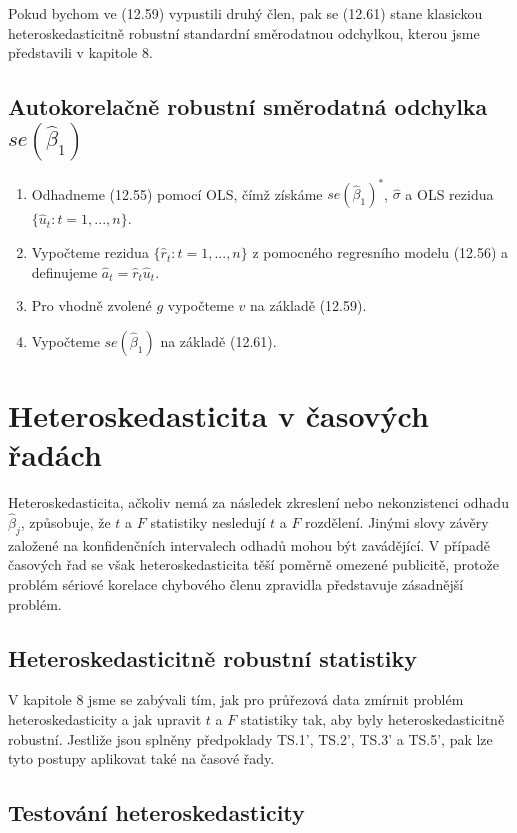 Pokud bychom ve (12.59) vypustili druhý člen, pak se (12.61) stane klasickou heteroskedasticitně robustní standardní směrodatnou odchylkou, kterou jsme představili v kapitole 8.

\subsection{Autokorelačně robustní směrodatná odchylka $se(\hat{\beta}_1)$}

\begin{enumerate}
\item Odhadneme (12.55) pomocí OLS, čímž získáme $se(\hat{\beta}_1)^*$, $\hat{\sigma}$ a OLS rezidua $\{\hat{u}_t: t = 1, ..., n\}$.
\item Vypočteme rezidua $\{\hat{r}_t: t = 1, ..., n\}$ z pomocného regresního modelu (12.56) a definujeme $\hat{a}_t = \hat{r}_t\hat{u}_t$.
\item Pro vhodně zvolené $g$ vypočteme $\hat{v}$ na základě (12.59).
\item Vypočteme $se(\hat{\beta}_1)$ na základě (12.61).
\end{enumerate}

\section{Heteroskedasticita v časových řadách}

Heteroskedasticita, ačkoliv nemá za následek zkreslení nebo nekonzistenci odhadu $\hat{\beta}_j$, způsobuje, že $t$ a $F$ statistiky nesledují $t$ a $F$ rozdělení. Jinými slovy závěry založené na konfidenčních intervalech odhadů mohou být zavádějící. V případě časových řad se však heteroskedasticita těší poměrně omezené publicitě, protože problém sériové korelace chybového členu zpravidla představuje zásadnější problém.

\subsection{Heteroskedasticitně robustní statistiky}

V kapitole 8 jsme se zabývali tím, jak pro průřezová data zmírnit problém heteroskedasticity a jak upravit $t$ a $F$ statistiky tak, aby byly heteroskedasticitně robustní. Jestliže jsou splněny předpoklady TS.1', TS.2', TS.3' a TS.5', pak lze tyto postupy aplikovat také na časové řady.

\subsection{Testování heteroskedasticity}

